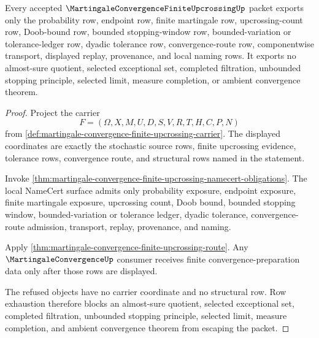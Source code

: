 \begin{theorem}
\label{thm:martingale-convergence-finite-upcrossing-nonescape}
Every accepted $\MartingaleConvergenceFiniteUpcrossingUp$ packet exports only the probability row, endpoint row, finite martingale row, upcrossing-count row, Doob-bound row, bounded stopping-window row, bounded-variation or tolerance-ledger row, dyadic tolerance row, convergence-route row, componentwise transport, displayed replay, provenance, and local naming rows. It exports no almost-sure quotient, selected exceptional set, completed filtration, unbounded stopping principle, selected limit, measure completion, or ambient convergence theorem.
\end{theorem}
\begin{proof}
Project the carrier
$$
F=(\Omega,X,M,U,D,S,V,R,T,H,C,P,N)
$$
from \autoref{def:martingale-convergence-finite-upcrossing-carrier}. The displayed coordinates are exactly the stochastic source rows, finite upcrossing evidence, tolerance rows, convergence route, and structural rows named in the statement.

Invoke \autoref{thm:martingale-convergence-finite-upcrossing-namecert-obligations}. The local NameCert surface admits only probability exposure, endpoint exposure, finite martingale exposure, upcrossing count, Doob bound, bounded stopping window, bounded-variation or tolerance ledger, dyadic tolerance, convergence-route admission, transport, replay, provenance, and naming.

Apply \autoref{thm:martingale-convergence-finite-upcrossing-route}. Any $\MartingaleConvergenceUp$ consumer receives finite convergence-preparation data only after those rows are displayed.

The refused objects have no carrier coordinate and no structural row. Row exhaustion therefore blocks an almost-sure quotient, selected exceptional set, completed filtration, unbounded stopping principle, selected limit, measure completion, and ambient convergence theorem from escaping the packet.
\end{proof}


